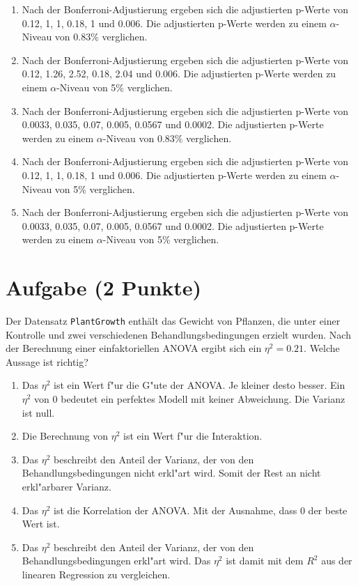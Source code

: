 \documentclass[a4paper, 10pt]{scrartcl}\usepackage[]{graphicx}\usepackage[]{color}
\begin{document}
\begin{enumerate}
\item [\textbf{A} \msquare] Nach der Bonferroni-Adjustierung ergeben sich die adjustierten p-Werte von 0.12, 1, 1, 0.18, 1 und 0.006. Die adjustierten p-Werte werden zu einem $\alpha$-Niveau von 0.83\% verglichen.
\item [\textbf{B} \msquare] Nach der Bonferroni-Adjustierung ergeben sich die adjustierten p-Werte von 0.12, 1.26, 2.52, 0.18, 2.04 und 0.006. Die adjustierten p-Werte werden zu einem $\alpha$-Niveau von 5\% verglichen.
\item [\textbf{C} \msquare] Nach der Bonferroni-Adjustierung ergeben sich die adjustierten p-Werte von 0.0033, 0.035, 0.07, 0.005, 0.0567 und 0.0002. Die adjustierten p-Werte werden zu einem $\alpha$-Niveau von 0.83\% verglichen.
\item [\textbf{D} \msquare] Nach der Bonferroni-Adjustierung ergeben sich die adjustierten p-Werte von 0.12, 1, 1, 0.18, 1 und 0.006. Die adjustierten p-Werte werden zu einem $\alpha$-Niveau von 5\% verglichen.
\item [\textbf{E} \msquare] Nach der Bonferroni-Adjustierung ergeben sich die adjustierten p-Werte von 0.0033, 0.035, 0.07, 0.005, 0.0567 und 0.0002. Die adjustierten p-Werte werden zu einem $\alpha$-Niveau von 5\% verglichen.
\end{enumerate} 

\section{Aufgabe \hfill (2 Punkte)}



Der Datensatz \texttt{PlantGrowth} enth{\"a}lt das Gewicht von Pflanzen, die
unter einer Kontrolle und zwei verschiedenen Behandlungsbedingungen erzielt
wurden. Nach der Berechnung einer einfaktoriellen ANOVA ergibt sich ein
$\eta^2 = 0.21$. Welche Aussage ist richtig?



\begin{enumerate}
\item [\textbf{A} \msquare] Das $\eta^2$ ist ein Wert f{"u}r die G{"u}te der ANOVA. Je kleiner desto besser. Ein $\eta^2$ von 0 bedeutet ein perfektes Modell mit keiner Abweichung. Die Varianz ist null.
\item [\textbf{B} \msquare] Die Berechnung von $\eta^2$ ist ein Wert f{"u}r die Interaktion.
\item [\textbf{C} \msquare] Das $\eta^2$ beschreibt den Anteil der Varianz, der von den Behandlungsbedingungen nicht erkl{"a}rt wird. Somit der Rest an nicht erkl{"a}rbarer Varianz.
\item [\textbf{D} \msquare] Das $\eta^2$ ist die Korrelation der ANOVA. Mit der Ausnahme, dass 0 der beste Wert ist.
\item [\textbf{E} \msquare] Das $\eta^2$ beschreibt den Anteil der Varianz, der von den Behandlungsbedingungen erkl{"a}rt wird. Das $\eta^2$ ist damit mit dem $R^2$ aus der linearen Regression zu vergleichen.
\end{enumerate} 
\end{document}
